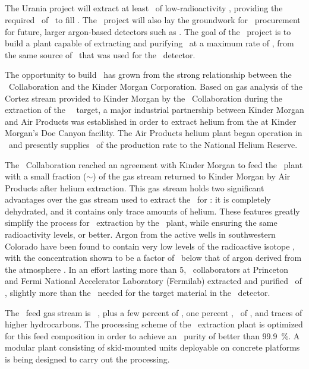 \subsection{\Urania}
The Urania project will extract at least \UraniaTotalDSkProduction\ of low-radioactivity \UAr, providing the required \DSkTotalMass\ of \UAr\ to fill \DSk.   The \Urania\ project will also lay the groundwork for \UAr\ procurement for future, larger argon-based detectors such as \Argo.  The goal of the \Urania\ project is to build a plant capable of extracting and purifying \UAr\ at a maximum rate of \UraniaUArRate, from the same source of \UAr\ that was used for the \DSf\ detector.  

The opportunity to build \Urania\ has grown from the strong relationship between the \DS\ Collaboration and the Kinder Morgan Corporation. Based on gas analysis of the Cortez stream provided to Kinder Morgan by the \DS\ Collaboration during the extraction of the \DSf\ \UAr\ target, a major industrial partnership between Kinder Morgan and Air Products was established in order to extract helium from the  at Kinder Morgan's Doe Canyon facility.  The Air Products helium plant began operation in \UraniaHeStartDate\ and presently supplies \UraniaHeNationalReserveFractionEquivalentRate\ of the production rate to the National Helium Reserve. 

The \DS\ Collaboration reached an agreement with Kinder Morgan to feed the \Urania\ plant with a small fraction ($\sim$\UraniaGasFeedFraction) of the gas stream returned to Kinder Morgan by Air Products after helium extraction.  This gas stream holds two significant advantages over the gas stream used to extract the \UAr\ for \DSf: it is completely dehydrated,  and it contains only trace amounts of helium. These features greatly simplify the process for \UAr\ extraction by the \Urania\ plant, while ensuring the same radioactivity levels, or better.  Argon from the active  wells in southwestern Colorado have been found to contain very low levels of the radioactive isotope  , with the concentration shown to be a factor of \DSfUArArThreeNineDepletion\ below that of argon derived from the atmosphere \cite{Agnes:2016fz}. In an effort lasting more than \SI{5}{\years}, \DSf\ collaborators at Princeton and Fermi National Accelerator Laboratory (Fermilab) extracted and purified \DSfUArMassDelivered\ of \UAr, slightly more than the  \DSfTotalMass\ needed for the target material in the \DSf\ detector. 

The \Urania\ feed gas stream is \UraniaCOTwoFeedFraction\ , plus a few percent of , one percent , \UraniaArFeedFraction\ of \UAr, and traces of higher hydrocarbons.  The processing scheme of the \UAr\ extraction plant is optimized for this feed composition in order to achieve an \UAr\ purity of better than \SI{99.9}{\percent}.  A modular plant consisting of skid-mounted units deployable on concrete platforms is being designed to carry out the processing.

